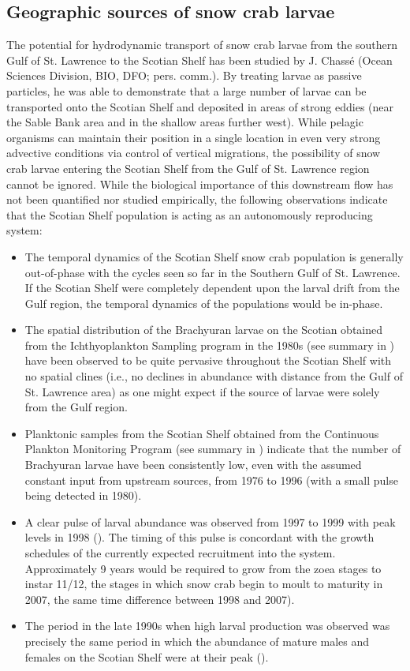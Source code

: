 \documentclass[11pt]{article}
\begin{document}
\subsection{Geographic sources of snow crab larvae}

The potential for hydrodynamic transport of snow crab larvae from the southern Gulf of St. Lawrence to the Scotian Shelf has been studied by J. Chass\'{e} (Ocean Sciences Division, BIO, DFO; pers. comm.). By treating larvae as passive particles, he was able to demonstrate that a large number of larvae can be transported onto the Scotian Shelf and deposited in areas of strong eddies (near the Sable Bank area and in the shallow areas further west). While pelagic organisms can maintain their position in a single location in even very strong advective conditions via control of vertical migrations, the possibility of snow crab larvae entering the Scotian Shelf from the Gulf of St. Lawrence region cannot be ignored. While the biological importance of this downstream flow has not been quantified nor studied empirically, the following observations indicate that the Scotian Shelf population is acting as an autonomously reproducing system:

\begin{itemize}
  \item The temporal dynamics of the Scotian Shelf snow crab population is generally out-of-phase with the cycles seen so far in the Southern Gulf of St. Lawrence. If the Scotian Shelf were completely dependent upon the larval drift from the Gulf region, the temporal dynamics of the populations would be in-phase. 
  \item The spatial distribution of the Brachyuran larvae on the Scotian obtained from the Ichthyoplankton Sampling program in the 1980s (see summary in \citealt[page 14]{Choi2005resdoc}) have been observed to be quite pervasive throughout the Scotian Shelf with no spatial clines (i.e., no declines in abundance with distance from the Gulf of St. Lawrence area) as one might expect if the source of larvae were solely from the Gulf region.
  \item Planktonic samples from the Scotian Shelf obtained from the Continuous Plankton Monitoring Program (see summary in \citealt[page 14]{Choi2005resdoc}) indicate that the number of Brachyuran larvae have been consistently low, even with the assumed constant input from upstream sources, from 1976 to 1996 (with a small pulse being detected in 1980). 
  \item A clear pulse of larval abundance was observed from 1997 to 1999 with peak levels in 1998 (\citealt[page 14]{Choi2005resdoc}). The timing of this pulse is concordant with the growth schedules of the currently expected recruitment into the system. Approximately 9 years would be required to grow from the zoea stages to instar 11/12, the stages in which snow crab begin to moult to maturity in 2007, the same time difference between 1998 and 2007). 
  \item The period in the late 1990s when high larval production was observed was precisely the same period in which the abundance of mature males and females on the Scotian Shelf were at their peak (\citealt[page 14]{Choi2005resdoc}). 
\end{itemize}
\end{document}
